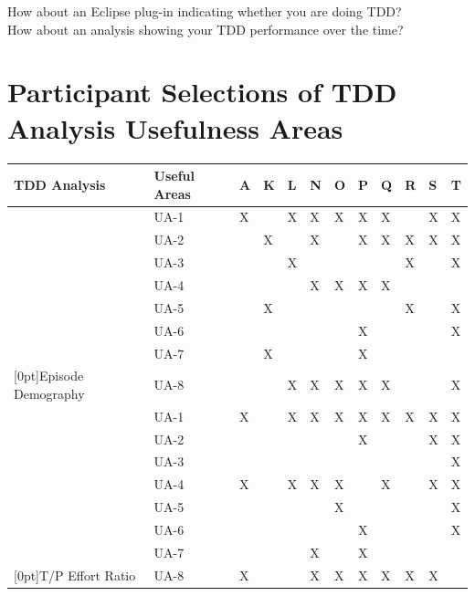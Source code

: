 \begin{enumerate}
  How about an Eclipse plug-in indicating whether you are doing TDD? \\
  How about an analysis showing your TDD performance over the time? \\
\end{enumerate}

\chapter{Participant Selections of TDD Analysis Usefulness Areas}
\label{app:UsefulnessAreas}
\begin{table}[!htbp]
\centering
  \begin{tabular}{|l|l|l|l|l|l|l|l|l|l|l|l|}
  \hline 
TDD Analysis   &   Useful Areas    &  A	&  K	&  L	&  N	&  O	&  P	&  Q	&  R	&  S	&  T  \\ \hline
    &  UA-1 &  X  &     &  X  &  X  &  X  &  X  &  X  &     &  X  &  X  \\ \cline{2-12}
    &  UA-2 &     &  X  &     &  X  &     &  X  &  X  &  X  &  X  &  X  \\ \cline{2-12}
    &  UA-3 &     &     &  X  &     &     &     &     &  X  &     &  X  \\ \cline{2-12}
    &  UA-4 &     &     &     &  X  &  X  &  X  &  X  &     &     &     \\ \cline{2-12}
    &  UA-5 &     &  X  &     &     &     &     &     &  X  &     &  X  \\ \cline{2-12}
    &  UA-6 &     &     &     &     &     &  X  &     &     &     &  X  \\ \cline{2-12}
    &  UA-7 &     &  X  &     &     &     &  X  &     &     &     &     \\ \cline{2-12}
\raisebox{10ex}[0pt]{Episode Demography}     
    &  UA-8 &     &     &  X  &  X  &  X  &  X  &  X  &     &     &  X  \\ \hline
    
    &  UA-1 &  X  &     &  X  &  X  &  X  &  X  &  X  &  X  &  X  &  X  \\ \cline{2-12} 
    &  UA-2 &     &     &     &     &     &  X  &     &     &  X  &  X  \\ \cline{2-12} 
    &  UA-3 &     &     &     &     &     &     &     &     &     &  X  \\ \cline{2-12} 
    &  UA-4 &  X  &     &  X  &  X  &  X  &     &  X  &     &  X  &  X  \\ \cline{2-12} 
    &  UA-5 &     &     &     &     &  X  &     &     &     &     &  X  \\ \cline{2-12}  
    &  UA-6 &     &     &     &     &     &  X  &     &     &     &  X  \\ \cline{2-12} 
    &  UA-7 &     &     &     &  X  &     &  X  &     &     &     &     \\ \cline{2-12} 
\raisebox{10ex}[0pt]{T/P Effort Ratio}  
    &  UA-8 &  X  &     &     &  X  &  X  &  X  &  X  &  X  &  X  &     \\ \hline


\end{tabular}
\end{table}
